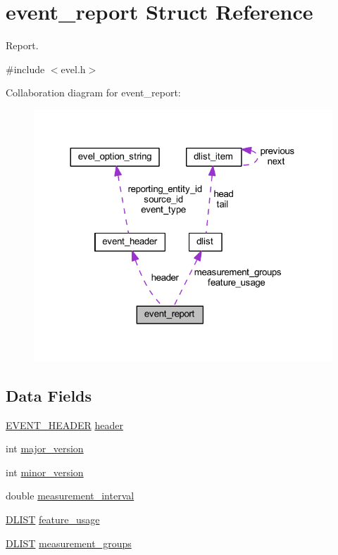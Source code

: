 \hypertarget{structevent__report}{}\section{event\+\_\+report Struct Reference}
\label{structevent__report}


Report.  




{\ttfamily \#include $<$evel.\+h$>$}



Collaboration diagram for event\+\_\+report\+:
\nopagebreak
\begin{figure}[H]
\begin{center}
\leavevmode
\includegraphics[width=320pt]{structevent__report__coll__graph}
\end{center}
\end{figure}
\subsection*{Data Fields}
\begin{DoxyCompactItemize}
\item 
\hyperlink{evel_8h_aa0ea94c675729365ea7825c4fc7e06d8}{E\+V\+E\+N\+T\+\_\+\+H\+E\+A\+D\+ER} \hyperlink{structevent__report_a7f9683ffdfa96c3c82913f7f60e95abb}{header}
\item 
int \hyperlink{structevent__report_a3ae8eebdad88e69dad8e943b8d6d12c2}{major\+\_\+version}
\item 
int \hyperlink{structevent__report_ae7de42df0d911b0f10914ede2aa3f2a6}{minor\+\_\+version}
\item 
double \hyperlink{structevent__report_add26cd9f3bbc2c88cd0ff774bfa3c9cd}{measurement\+\_\+interval}
\item 
\hyperlink{double__list_8h_a45f4a129042d9e1aa4ffd31fe13e4d14}{D\+L\+I\+ST} \hyperlink{structevent__report_abb6a555e0bf695531258a22286826cc2}{feature\+\_\+usage}
\item 
\hyperlink{double__list_8h_a45f4a129042d9e1aa4ffd31fe13e4d14}{D\+L\+I\+ST} \hyperlink{structevent__report_a1b6ed94783d22c55051a4d52eebb7686}{measurement\+\_\+groups}
\end{DoxyCompactItemize}



